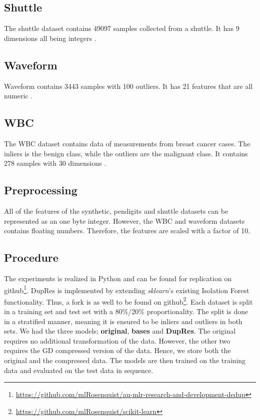 \subsection*{Shuttle}
The shuttle dataset contains 49097 samples collected from a shuttle. It has 9 dimensions all being integers \cite{ODDS}.

\subsection*{Waveform}
Waveform contains 3443 samples with 100 outliers. It has 21 features that are all numeric \cite{waveform}.

\subsection*{WBC}
The WBC dataset contains data of measurements from breast cancer cases. The inliers is the benign class, while the outliers are the malignant class. It contains 278 samples with 30 dimensions \cite{ODDS}.

\subsection{Preprocessing}
All of the features of the synthetic, pendigits and shuttle datasets can be represented as an one byte integer. However, the WBC and waveform datasets contains floating numbers. Therefore, the features are scaled with a factor of 10.

\subsection{Procedure}
The experiments is realized in Python and can be found for replication on github\footnote{\href{https://github.com/mlRosenquist/au-mlr-research-and-development-dedup}{https://github.com/mlRosenquist/au-mlr-research-and-development-dedup}}. DupRes is implemented by extending \textit{sklearn}'s existing Isolation Forest functionality. Thus, a fork is as well to be found on github\footnote{\href{https://github.com/mlRosenquist/scikit-learn}{https://github.com/mlRosenquist/scikit-learn}}.
Each dataset is split in a training set and test set with a 80\%/20\% proportionality. The split is done in a stratified manner, meaning it is ensured to be inliers and outliers in both sets. We had the three models; \textbf{original}, \textbf{bases} and \textbf{DupRes}. The original requires no additional transformation of the data. However, the other two requires the GD compressed version of the data. Hence, we store both the original and the compressed data. The models are then trained on the training data and evaluated on the test data in sequence.

